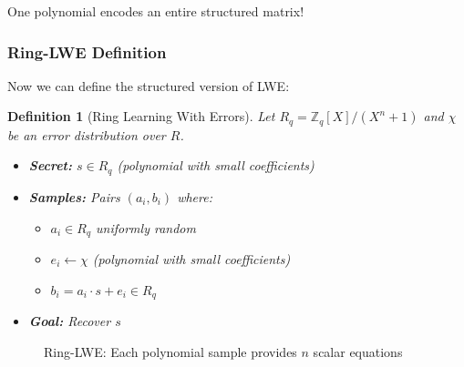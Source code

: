 \documentclass[11pt,a4paper]{article}
\newtheorem{definition}{Definition}
\begin{document}
One polynomial encodes an entire structured matrix!

\subsubsection{Ring-LWE Definition}

Now we can define the structured version of LWE:

\begin{definition}[Ring Learning With Errors]
Let $R_q = \mathbb{Z}_q[X]/(X^n + 1)$ and $\chi$ be an error distribution over $R$.
\begin{itemize}
    \item \textbf{Secret:} $s \in R_q$ (polynomial with small coefficients)
    \item \textbf{Samples:} Pairs $(a_i, b_i)$ where:
    \begin{itemize}
        \item $a_i \in R_q$ uniformly random
        \item $e_i \leftarrow \chi$ (polynomial with small coefficients)
        \item $b_i = a_i \cdot s + e_i \in R_q$
    \end{itemize}
    \item \textbf{Goal:} Recover $s$
\end{itemize}
\end{definition}

\begin{figure}[h]
\centering
{}
\caption{Ring-LWE: Each polynomial sample provides $n$ scalar equations}
\end{figure}
\end{document}
